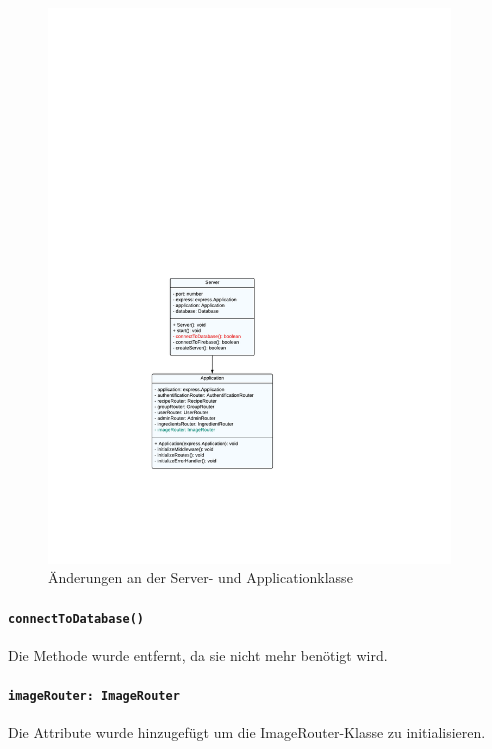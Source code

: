 \documentclass{implementierungsheft}
\begin{document}
\begin{figure}[htp]
    \centering
    \includegraphics[width=0.95\textwidth]{images/uml/server.pdf}
    \caption{Änderungen an der Server- und Applicationklasse}
    \label{fig:server}
\end{figure}
\paragraph{\texttt{connectToDatabase()}} Die Methode wurde entfernt, da sie nicht mehr benötigt wird.

\paragraph{\texttt{imageRouter: ImageRouter}} Die Attribute wurde hinzugefügt um die ImageRouter-Klasse zu initialisieren.
\end{document}
